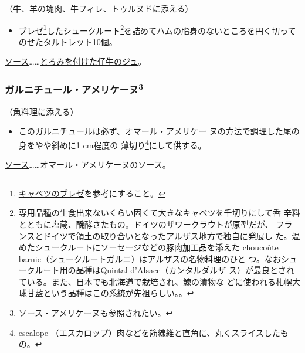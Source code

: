\begin{recette}
（牛、羊の塊肉、牛フィレ、トゥルヌドに添える）

\begin{itemize}
\tightlist
\item
  ブレゼ\footnote{\protect\hyperlink{chou-braise}{キャベツのブレゼ}を参考にすること。}したシュークルート\footnote{専用品種の生食出来ないくらい固くて大きなキャベツを千切りにして香
    辛料とともに塩蔵、醗酵さたもの。ドイツのザワークラウトが原型だが、
    フランスとドイツで領土の取り合いとなったアルザス地方で独自に発展し
    た。温めたシュークルートにソーセージなどの豚肉加工品を添えた
    choucoûte barnie（シュークルートガルニ）はアルザスの名物料理のひと
    つ。なおシュークルート用の品種はQuintal d'Alsace（カンタルダルザ
    ス）が最良とされている。また、日本でも北海道で栽培され、鰊の漬物な
    どに使われる札幌大球甘藍という品種はこの系統が先祖らしい。。}を詰めてハムの脂身のないところを円く切ってのせたタルトレット10個。
\end{itemize}

\ul{ソース}\ldots{}\ldots{}\protect\hyperlink{jus-de-veau-lie}{とろみを付けた仔牛のジュ}。

\hypertarget{garniture-americaine}{%
\subsubsection[ガルニチュール・アメリケーヌ]{\texorpdfstring{ガルニチュール・アメリケーヌ\footnote{\protect\hyperlink{sauce-americaine}{ソース・アメリケーヌ}も参照されたい。}}{ガルニチュール・アメリケーヌ}}\label{garniture-americaine}}



（魚料理に添える）

\begin{itemize}
\tightlist
\item
  このガルニチュールは必ず、\protect\hyperlink{homard-americaine}{オマール・アメリケー
  ヌ}の方法で調理した尾の身をやや斜めに1 cm程度の 薄切り\footnote{escalope
    （エスカロップ）肉などを筋線維と直角に、丸くスライスしたもの。}にして供する。
\end{itemize}

\ul{ソース}\ldots{}\ldots{}オマール・アメリケーヌのソース。


\end{recette}
